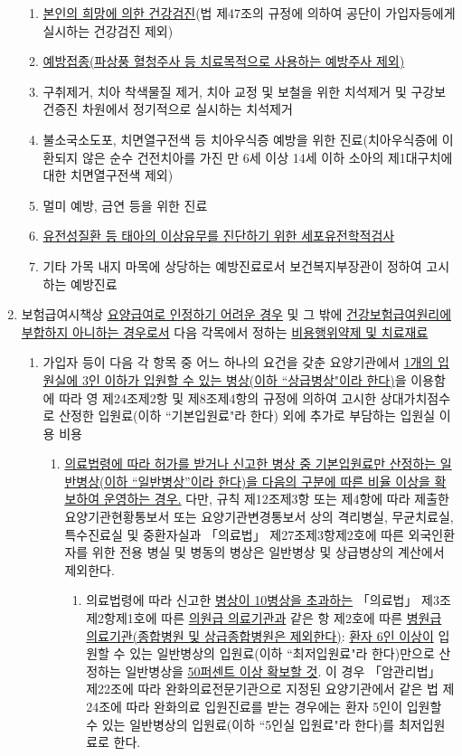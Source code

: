 \begin{enumerate}[1.]
	\begin{enumerate}[가.]\tightlist
	\item \uline{본인의 희망에 의한 건강검진}(법 제47조의 규정에 의하여 공단이 가입자등에게 실시하는 건강검진 제외)
	\item \uline{예방접종(파상풍 혈청주사 등 치료목적으로 사용하는 예방주사 제외)}
	\item 구취제거, 치아 착색물질 제거, 치아 교정 및 보철을 위한 치석제거 및 구강보건증진 차원에서 정기적으로 실시하는 치석제거
	\item 불소국소도포, 치면열구전색 등 치아우식증 예방을 위한 진료(치아우식증에 이환되지 않은 순수 건전치아를 가진 만 6세 이상 14세 이하 소아의 제1대구치에 대한 치면열구전색 제외)
	\item 멀미 예방, 금연 등을 위한 진료
	\item \uline{유전성질환 등 태아의 이상유무를 진단하기 위한 세포유전학적검사}
	\item 기타 가목 내지 마목에 상당하는 예방진료로서 보건복지부장관이 정하여 고시하는 예방진료
	\end{enumerate}
\item 보험급여시책상 \uline{요양급여로 인정하기 어려운 경우} 및 그 밖에 \uline{건강보험급여원리에 부합하지 아니하는 경우로서} 다음 각목에서 정하는 \uline{비용\cntrdot{}행위\cntrdot{}약제 및 치료재료}
	\begin{enumerate}[가.]\tightlist
	\item 가입자 등이 다음 각 항목 중 어느 하나의 요건을 갖춘 요양기관에서 \uline{1개의 입원실에 3인 이하가 입원할 수 있는 병상(이하 ``상급병상"이라 한다)}을 이용함에 따라 영 제24조제2항 및 제8조제4항의 규정에 의하여 고시한 상대가치점수로 산정한 입원료(이하 ``기본입원료"라 한다) 외에 추가로 부담하는 입원실 이용 비용
    		\begin{enumerate}[(1)]\tightlist
			\item \uline{의료법령에 따라 허가를 받거나 신고한 병상 중 기본입원료만 산정하는 일반병상(이하 “일반병상”이라 한다)을 다음의 구분에 따른 비율 이상을 확보하여 운영하는 경우.} 다만, 규칙 제12조제3항 또는 제4항에 따라 제출한 요양기관현황통보서 또는 요양기관변경통보서 상의 격리병실, 무균치료실, 특수진료실 및 중환자실과 「의료법」 제27조제3항제2호에 따른 외국인환자를 위한 전용 병실 및 병동의 병상은 일반병상 및 상급병상의 계산에서 제외한다.
     			\begin{enumerate}[(가)]\tightlist
				\item 의료법령에 따라 신고한 \uline{병상이 10병상을 초과하는} 「의료법」 제3조제2항제1호에 따른 \uline{의원급 의료기관과} 같은 항 제2호에 따른 \uline{병원급 의료기관(종합병원 및 상급종합병원은 제외한다)}: \uline{환자 6인 이상이} 입원할 수 있는 일반병상의 입원료(이하 “최저입원료"라 한다)만으로 산정하는 일반병상을 \uline{50퍼센트 이상 확보할 것}. 이 경우 「암관리법」 제22조에 따라 완화의료전문기관으로 지정된 요양기관에서 같은 법 제24조에 따라 완화의료 입원진료를 받는 경우에는 환자 5인이 입원할 수 있는 일반병상의 입원료(이하 ``5인실 입원료"라 한다)를 최저입원료로 한다. 

\end{enumerate}
\end{enumerate}
\end{enumerate}
\end{enumerate}
